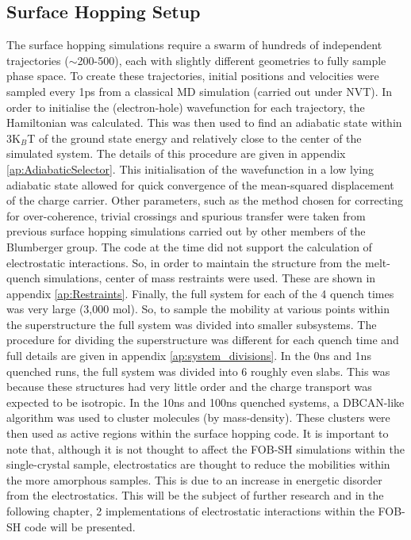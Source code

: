 \subsection{Surface Hopping Setup}
The surface hopping simulations require a swarm of hundreds of independent trajectories ($\sim$200-500), each with slightly different geometries to fully sample phase space. To create these trajectories, initial positions and velocities were sampled every 1ps from a classical MD simulation (carried out under NVT). In order to initialise the (electron-hole) wavefunction for each trajectory, the Hamiltonian was calculated. This was then used to find an adiabatic state within 3K$_{B}$T of the ground state energy and relatively close to the center of the simulated system. The details of this procedure are given in appendix \ref{ap:AdiabaticSelector}. This initialisation of the wavefunction in a low lying adiabatic state allowed for quick convergence of the mean-squared displacement of the charge carrier. Other parameters, such as the method chosen for correcting for over-coherence, trivial crossings and spurious transfer were taken from previous surface hopping simulations carried out by other members of the Blumberger group. The code at the time did not support the calculation of electrostatic interactions. So, in order to maintain the structure from the melt-quench simulations, center of mass restraints were used. These are shown in appendix \ref{ap:Restraints}. Finally, the full system for each of the 4 quench times was very large (3,000 mol). So, to sample the mobility at various points within the superstructure the full system was divided into smaller subsystems. The procedure for dividing the superstructure was different for each quench time and full details are given in appendix \ref{ap:system_divisions}. In the 0ns and 1ns quenched runs, the full system was divided into 6 roughly even slabs. This was because these structures had very little order and the charge transport was expected to be isotropic. In the 10ns and 100ns quenched systems, a DBCAN-like algorithm \cite{DBSCAN} was used to cluster molecules (by mass-density). These clusters were then used as active regions within the surface hopping code. It is important to note that, although it is not thought to affect the FOB-SH simulations within the single-crystal sample, electrostatics are thought to reduce the mobilities within the more amorphous samples. This is due to an increase in energetic disorder \cite{ESEffectOnMob} from the electrostatics. This will be the subject of further research and in the following chapter, 2 implementations of electrostatic interactions within the FOB-SH code will be presented.

